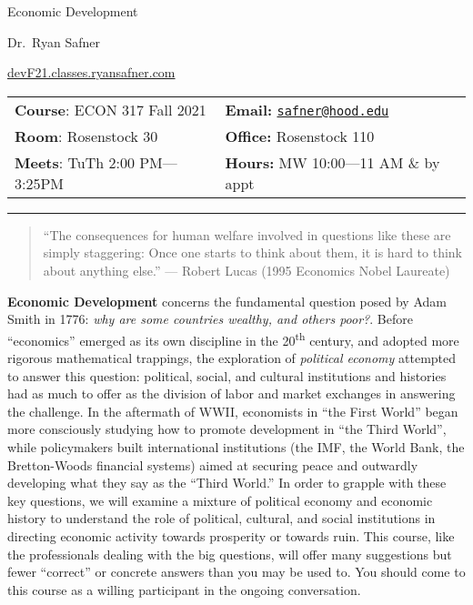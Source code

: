 \documentclass{article}
\begin{document}
\sffamily

\centerline{\Huge Economic Development}

\vspace{3 mm}

\centerline{\large Dr.~Ryan Safner}
\vspace{2 mm}
\centerline{\large \href{http://devF21.classes.ryansafner.com}{devF21.classes.ryansafner.com}}

\vspace{5 mm}

\begin{tabular}{@{}p{3.5in}p{3.5in}}           
\textbf{Course}: ECON 317 Fall
2021  & \textbf{Email:}  \href{mailto:safner@hood.edu}{\nolinkurl{safner@hood.edu}}\\
\textbf{Room}: Rosenstock 30 & \textbf{Office:}  Rosenstock 110\\
\textbf{Meets}: TuTh 2:00 PM---3:25PM & \textbf{Hours:}  MW 10:00---11
AM \& by appt\\ 
\end{tabular}

\vspace{5 mm}

\hrule


\begin{quote}
``The consequences for human welfare involved in questions like these
are simply staggering: Once one starts to think about them, it is hard
to think about anything else.'' {--- Robert Lucas (1995 Economics Nobel
Laureate)}
\end{quote}

\textbf{Economic Development} concerns the fundamental question posed by
Adam Smith in 1776: \emph{why are some countries wealthy, and others
poor?}. Before ``economics'' emerged as its own discipline in the
20\textsuperscript{th} century, and adopted more rigorous mathematical
trappings, the exploration of \emph{political economy} attempted to
answer this question: political, social, and cultural institutions and
histories had as much to offer as the division of labor and market
exchanges in answering the challenge. In the aftermath of WWII,
economists in ``the First World'' began more consciously studying how to
promote development in ``the Third World'', while policymakers built
international institutions (the IMF, the World Bank, the Bretton-Woods
financial systems) aimed at securing peace and outwardly developing what
they say as the ``Third World.'' In order to grapple with these key
questions, we will examine a mixture of political economy and economic
history to understand the role of political, cultural, and social
institutions in directing economic activity towards prosperity or
towards ruin. This course, like the professionals dealing with the big
questions, will offer many suggestions but fewer ``correct'' or concrete
answers than you may be used to. You should come to this course as a
willing participant in the ongoing conversation.
\end{document}
